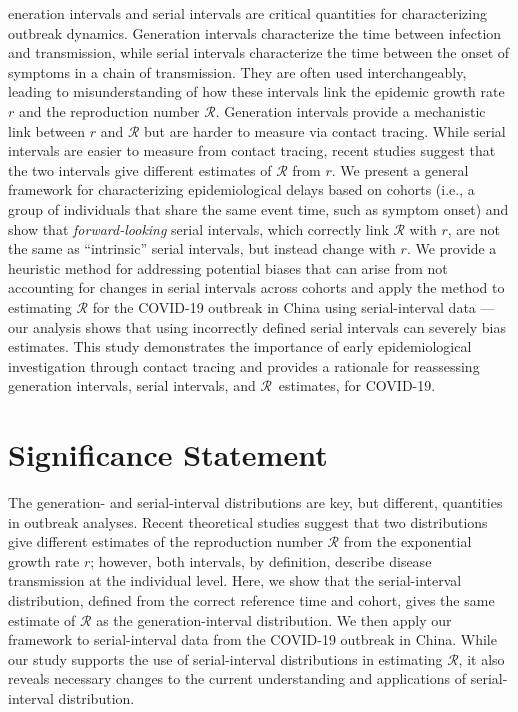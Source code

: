 \documentclass[12pt]{article}
\newcommand{\RR}{\ensuremath{{\mathcal R}}\xspace}
\newcommand{\dropcapfont}{\fontfamily{lmss}\bfseries\fontsize{26pt}{28pt}\selectfont}
\newcommand{\dropcap}[1]{\lettrine[lines=2,lraise=0.05,findent=0.1em, nindent=0em]{{\dropcapfont{#1}}}{}}
\begin{document}
\dropcap{G}eneration intervals and serial intervals are critical quantities for characterizing outbreak dynamics.
Generation intervals characterize the time between infection and transmission, while serial intervals characterize the time between the onset of symptoms in a chain of transmission.
They are often used interchangeably, leading to misunderstanding of how these intervals link the epidemic growth rate $r$ and the reproduction number \RR.
Generation intervals provide a mechanistic link between $r$ and \RR but are harder to measure via contact tracing.
While serial intervals are easier to measure from contact tracing, recent studies suggest that the two intervals give different estimates of \RR from $r$.
We present a general framework for characterizing epidemiological delays based on cohorts (i.e., a group of individuals that share the same event time, such as symptom onset) and show that \emph{forward-looking} serial intervals, which correctly link \RR with $r$, are not the same as ``intrinsic'' serial intervals, but instead change with $r$.
We provide a heuristic method for addressing potential biases that can arise from not accounting for changes in serial intervals across cohorts and apply the method to estimating \RR for the COVID-19 outbreak in China using serial-interval data --- our analysis shows that using incorrectly defined serial intervals can severely bias estimates.
This study demonstrates the importance of early epidemiological investigation through contact tracing and provides a rationale for reassessing generation intervals, serial intervals, and \RR\ estimates, for COVID-19.

\section*{Significance Statement}

The generation- and serial-interval distributions are key, but different, quantities in outbreak analyses.
Recent theoretical studies suggest that two distributions give different estimates of the reproduction number \RR from the exponential growth rate $r$;
however, both intervals, by definition, describe disease transmission at the individual level.
Here, we show that the serial-interval distribution, defined from the correct reference time and cohort, gives the same estimate of \RR as the generation-interval distribution.
We then apply our framework to serial-interval data from the COVID-19 outbreak in China.
While our study supports the use of serial-interval distributions in estimating \RR, it also reveals necessary changes to the current understanding and applications of serial-interval distribution.
\end{document}
